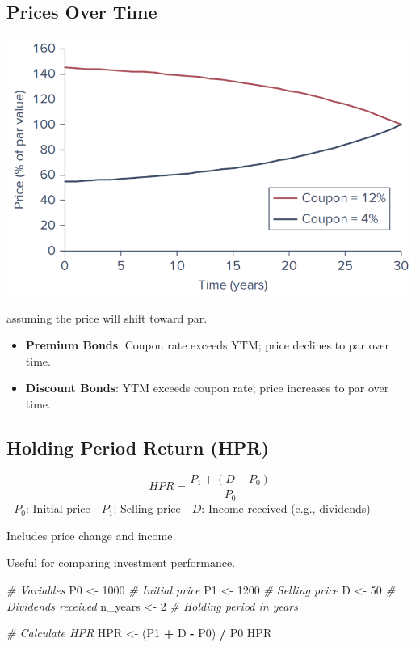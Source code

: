 \documentclass[
]{book}
\newenvironment{Shaded}{\begin{snugshade}}{\end{snugshade}}
\newcommand{\CommentTok}[1]{\textcolor[rgb]{0.56,0.35,0.01}{\textit{#1}}}
\newcommand{\DecValTok}[1]{\textcolor[rgb]{0.00,0.00,0.81}{#1}}
\newcommand{\NormalTok}[1]{#1}
\newcommand{\OtherTok}[1]{\textcolor[rgb]{0.56,0.35,0.01}{#1}}
\newcommand{\SpecialCharTok}[1]{\textcolor[rgb]{0.81,0.36,0.00}{\textbf{#1}}}
\begin{document}
\hypertarget{prices-over-time}{%
\subsection{Prices Over Time}\label{prices-over-time}}

\includegraphics{Resources/parval.png}

assuming the price will shift toward par.

\begin{itemize}
\item
  \textbf{Premium Bonds}: Coupon rate exceeds YTM; price declines to par
  over time.
\item
  \textbf{Discount Bonds}: YTM exceeds coupon rate; price increases to
  par over time.
\end{itemize}

\hypertarget{holding-period-return-hpr}{%
\subsection{Holding Period Return
(HPR)}\label{holding-period-return-hpr}}

\[
HPR = \frac{P_1 + (D - P_0)}{P_0}
\] - \(P_0\): Initial price - \(P_1\): Selling price - \(D\): Income
received (e.g., dividends)

Includes price change and income.

Useful for comparing investment performance.

\begin{Shaded}
\begin{Highlighting}[]
\CommentTok{\# Variables}
\NormalTok{P0 }\OtherTok{\textless{}{-}} \DecValTok{1000}     \CommentTok{\# Initial price}
\NormalTok{P1 }\OtherTok{\textless{}{-}} \DecValTok{1200}      \CommentTok{\# Selling price}
\NormalTok{D }\OtherTok{\textless{}{-}} \DecValTok{50}         \CommentTok{\# Dividends received}
\NormalTok{n\_years }\OtherTok{\textless{}{-}} \DecValTok{2}   \CommentTok{\# Holding period in years}

\CommentTok{\# Calculate HPR}
\NormalTok{HPR }\OtherTok{\textless{}{-}}\NormalTok{ (P1 }\SpecialCharTok{+}\NormalTok{ D }\SpecialCharTok{{-}}\NormalTok{ P0) }\SpecialCharTok{/}\NormalTok{ P0}
\NormalTok{HPR}
\end{Highlighting}
\end{Shaded}
\end{document}
